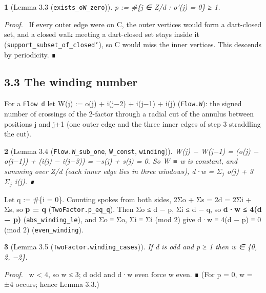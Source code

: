 \documentclass[11pt,a4paper]{article}
\theoremstyle{named}
\newtheorem*{namedthm}{}
\newenvironment{mdproof}[1][Proof]{\par\medskip\noindent\textit{#1.}\ }{\par\medskip}
\begin{document}
\begin{namedthm}[Lemma 3.3 (\texttt{exists\_\allowbreak{}oW\_\allowbreak{}zero})]
p := \#\{j ∈ Z/d : o'(j) = 0\} ≥ 1.
\end{namedthm}
\begin{mdproof}[Proof]
If every outer edge were on C, the outer vertices would form a dart-closed set, and a closed walk meeting a dart-closed set stays inside it (\texttt{support\_\allowbreak{}subset\_\allowbreak{}of\_\allowbreak{}closed'}), so C would miss the inner vertices. This descends by periodicity. ∎
\end{mdproof}

\subsection*{3.3 The winding number}
For a \texttt{Flow\ \allowbreak{}d} let W(j) := o(j) + i(j−2) + i(j−1) + i(j) (\texttt{Flow.\allowbreak{}W}): the signed number of crossings of the 2-factor through a radial cut of the annulus between positions j and j+1 (one outer edge and the three inner edges of step 3 straddling the cut).

\begin{namedthm}[Lemma 3.4 (\texttt{Flow.\allowbreak{}W\_\allowbreak{}sub\_\allowbreak{}one}, \texttt{W\_\allowbreak{}const}, \texttt{winding})]
W(j) − W(j−1) = (o(j) − o(j−1)) + (i(j) − i(j−3)) = −s(j) + s(j) = 0. So W ≡ w is constant, and summing over Z/d (each inner edge lies in three windows), d·w = $Σ_j$ o(j) + 3 $Σ_j$ i(j). ∎
\end{namedthm}

Let q := \#\{i = 0\}. Counting spokes from both sides, 2Σ\textbar{}o\textbar{} + Σ\textbar{}s\textbar{} = 2d = 2Σ\textbar{}i\textbar{} + Σ\textbar{}s\textbar{}, so \textbf{p = q} (\texttt{TwoFactor.\allowbreak{}p\_\allowbreak{}eq\_\allowbreak{}q}). Then \textbar{}Σo\textbar{} ≤ d − p, \textbar{}Σi\textbar{} ≤ d − q, so \textbf{\textbar{}d·w\textbar{} ≤ 4(d − p)} (\texttt{abs\_\allowbreak{}winding\_\allowbreak{}le}), and Σo ≡ Σ\textbar{}o\textbar{}, Σi ≡ Σ\textbar{}i\textbar{} (mod 2) give d·w ≡ 4(d − p) ≡ 0 (mod 2) (\texttt{even\_\allowbreak{}winding}).

\begin{namedthm}[Lemma 3.5 (\texttt{TwoFactor.\allowbreak{}winding\_\allowbreak{}cases})]
If d is odd and p ≥ 1 then w ∈ \{0, 2, −2\}.
\end{namedthm}
\begin{mdproof}[Proof]
\textbar{}w\textbar{} \textless{} 4, so \textbar{}w\textbar{} ≤ 3; d odd and d·w even force w even. ∎ (For p = 0, w = ±4 occurs; hence Lemma 3.3.)
\end{mdproof}
\end{document}
